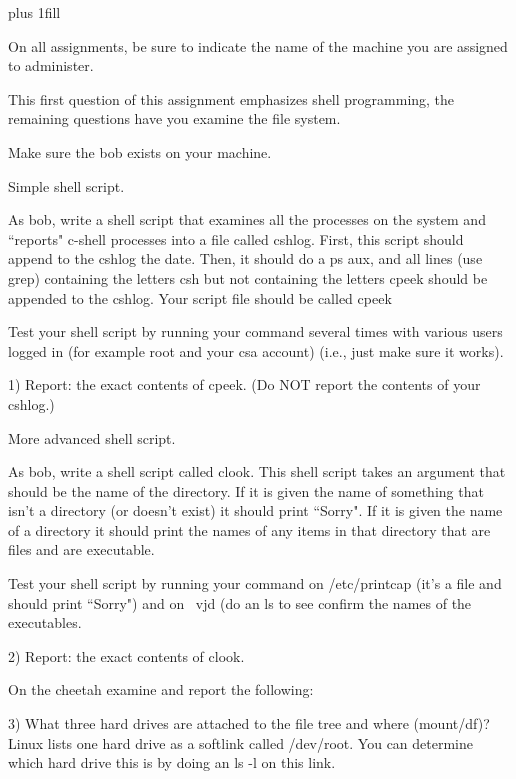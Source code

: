 
\rightskip=0pt plus 1fill

\parindent 0pt

On all assignments, be sure to indicate the name of the
machine you are assigned to administer.

This first question of this assignment emphasizes shell programming,
the remaining questions have you examine the file system.

Make sure the {\ltt{}bob} exists on your 
machine.

Simple shell script.

As bob, write a shell script that examines all the processes on the
system and ``reports" c-shell processes
into a file called {\ltt{}cshlog}.
First, this script should append to the {\ltt{}cshlog} the {\ltt{}date}.
Then, it should do a {\ltt{}ps aux}, and all lines (use {\ltt{}grep})
containing the letters csh but not containing the letters cpeek
should be appended to the {\ltt{}cshlog}.
Your script file should be called {\ltt{}cpeek}

Test your shell script by
running your command several times with various users logged 
in (for example root and your csa account)
(i.e., just make sure it works).

1) Report: the exact contents of {\ltt{}cpeek}.
(Do NOT report the contents of your cshlog.)

More advanced shell script.

As bob, write a shell script called {\ltt{}clook}.
This shell script takes an argument that should be the name of the directory.
If it is given the name of something that isn't a directory (or doesn't
exist) it should print ``Sorry".
If it is given the name of a directory it should print the names of
any items in that directory that are files and are executable. 

Test your shell script by running your command on {\ltt{}/etc/printcap}
(it's a file and should print ``Sorry") and on {\ltt{}~vjd} (do an {\ltt{}ls}
to see confirm the names of the executables.

2) Report: the exact contents of {\ltt{}clook}.

On the {\ltt{}cheetah} examine and report the following:

3) What three hard drives are attached to the file tree and where (mount/df)?
Linux lists one hard drive as a softlink called {\ltt{}/dev/root}.
You can determine which hard drive this is by doing an {\ltt{}ls -l} on
this link.

